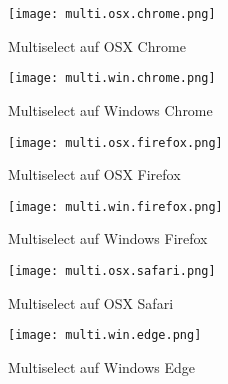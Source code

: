 
\begin{figure}[!htb]
    \centering
    \begin{minipage}[b]{0.45\textwidth}
        \centering
        \texttt{[image: multi.osx.chrome.png]}
        \caption{Multiselect auf OSX Chrome}
        \label{img:multiOsxChromeSelect}
    \end{minipage}
    \hfill
    \begin{minipage}[b]{0.45\textwidth}
        \centering
        \texttt{[image: multi.win.chrome.png]}
        \caption{Multiselect auf Windows Chrome}
        \label{img:multiWinChromeSelect}
    \end{minipage}
\end{figure}

\begin{figure}[!htb]
    \centering
    \begin{minipage}[b]{0.45\textwidth}
        \centering
        \texttt{[image: multi.osx.firefox.png]}
        \caption{Multiselect auf OSX Firefox}
        \label{img:multiOsxFirefoxSelect}
    \end{minipage}
    \hfill
    \begin{minipage}[b]{0.45\textwidth}
        \centering
        \texttt{[image: multi.win.firefox.png]}
        \caption{Multiselect auf Windows Firefox}
        \label{img:multiWinFirefoxSelect}
    \end{minipage}
\end{figure}

\begin{figure}[!htb]
    \centering
    \begin{minipage}[b]{0.45\textwidth}
        \centering
        \texttt{[image: multi.osx.safari.png]}
        \caption{Multiselect auf OSX Safari}
        \label{img:multiOsxSafariSelect}
    \end{minipage}
    \hfill
    \begin{minipage}[b]{0.45\textwidth}
        \centering
        \texttt{[image: multi.win.edge.png]}
        \caption{Multiselect auf Windows Edge}
        \label{img:multiWinEdgeSelect}
    \end{minipage}
\end{figure}


